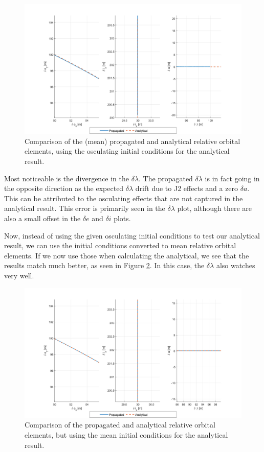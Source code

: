 \begin{figure}[H]
    \centering
    \includegraphics[width=0.8\linewidth]{sim/figures/PS4/ROE_analytical_compare_given_IC2_SV2.png}
    \caption{Comparison of the (mean) propagated and analytical relative orbital elements, using the osculating initial conditions for the analytical result.}
\label{fig:roe_analytical_compare_osc}
\end{figure}

Most noticeable is the divergence in the $\delta \lambda$. The propagated $\delta \lambda$ is in fact going in the opposite direction as the expected $\delta \lambda$ drift due to J2 effects and a zero $\delta a$. This can be attributed to the osculating effects that are not captured in the analytical result. This error is primarily seen in the $\delta \lambda$ plot, although there are also a small offset in the $\delta e$ and $\delta i$ plots.

Now, instead of using the given osculating initial conditions to test our analytical result, we can use the initial conditions converted to mean relative orbital elements. If we now use those when calculating the analytical, we see that the results match much better, as seen in Figure \ref{fig:roe_analytical_compare_mean}. In this case, the $\delta \lambda$ also watches very well.

\begin{figure}[H]
    \centering
    \includegraphics[width=0.8\linewidth]{sim/figures/PS4/ROE_analytical_compare_mean_IC2_SV2.png}
    \caption{Comparison of the propagated and analytical relative orbital elements, but using the mean initial conditions for the analytical result.}
\label{fig:roe_analytical_compare_mean}
\end{figure}

